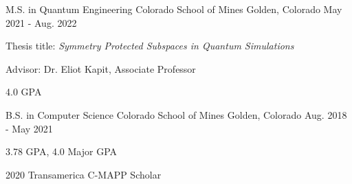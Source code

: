 

\begin{cventries}

  \cventry
    {M.S. in Quantum Engineering}
    {Colorado School of Mines}
    {Golden, Colorado}
    {May 2021 - Aug. 2022}
    {
      \begin{cvitems}
        \item{Thesis title: \emph{Symmetry Protected Subspaces in Quantum Simulations}}
        \item{Advisor: Dr. Eliot Kapit, Associate Professor}
        \item{4.0 GPA}
      \end{cvitems}
    }

  \cventry
      {B.S. in Computer Science}
      {Colorado School of Mines}
      {Golden, Colorado}
      {Aug. 2018 - May 2021}
      {
        \begin{cvitems}
          \item{3.78 GPA, 4.0 Major GPA}
          \item{2020 Transamerica C-MAPP Scholar}
        \end{cvitems}
      }

\end{cventries}
